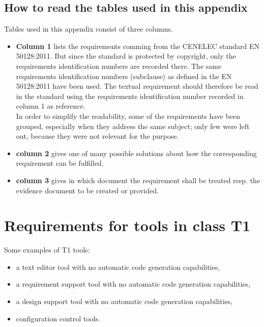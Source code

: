 \documentclass{template/openetcs_report}
\begin{document}
\subsection{How to read the tables used in this appendix}
Tables used in this appendix consist of three columns.
\begin{itemize}\itemsep=0pt
  \item \textbf{Column 1} lists the requirements comming from the CENELEC standard EN 50128:2011. But since the standard is protected by copyright, only the requirements identification numbers are recorded there. The same requirements identification numbers (subclause) as defined in the EN 50128:2011 have been used. The textual requirement should therefore be read in the standard using the requirements identification number recorded in column 1 as reference.\\
In order to simplify the readability, some of the requirements have been grouped, especially when they address the same subject; only few were left out, because they were not relevant for the purpose.
  \item \textbf{column 2} gives one of many possible solutions about how the corresponding requirement can be fulfilled.
  \item \textbf{column 3} gives in which document the requirement shall be treated resp. the evidence document to be created or provided.
\end{itemize}


\section{Requirements for tools in class T1}
\label{T1}
Some examples of T1 tools:
\begin{itemize}\itemsep=0pt
  \item a text editor tool with no automatic code generation capabilities,
  \item a requirement support tool with no automatic code generation capabilities,
  \item a design support tool with no automatic code generation capabilities,
  \item configuration control tools.
\end{itemize}
\end{document}
